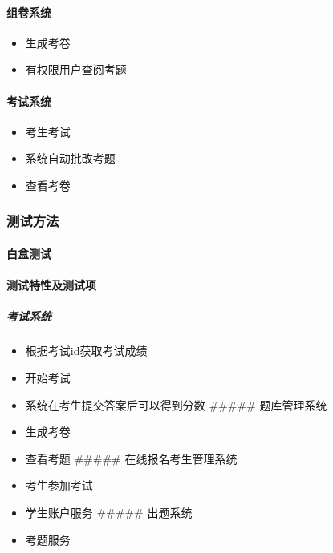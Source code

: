 \documentclass[hyperref, a4paper]{ctexart}
\providecommand{\tightlist}{%
  \setlength{\itemsep}{0pt}\setlength{\parskip}{0pt}}
\let\oldparagraph\paragraph
\renewcommand{\paragraph}[1]{\oldparagraph{#1}\mbox{}}
\let\oldsubparagraph\subparagraph
\renewcommand{\subparagraph}[1]{\oldsubparagraph{#1}\mbox{}}
\begin{document}
\hypertarget{ux7ec4ux5377ux7cfbux7edf-1}{%
\paragraph{组卷系统}\label{ux7ec4ux5377ux7cfbux7edf-1}}

\begin{itemize}
\tightlist
\item
  生成考卷
\item
  有权限用户查阅考题
\end{itemize}

\hypertarget{ux8003ux8bd5ux7cfbux7edf-1}{%
\paragraph{考试系统}\label{ux8003ux8bd5ux7cfbux7edf-1}}

\begin{itemize}
\tightlist
\item
  考生考试
\item
  系统自动批改考题
\item
  查看考卷
\end{itemize}

\hypertarget{ux6d4bux8bd5ux65b9ux6cd5}{%
\subsubsection{测试方法}\label{ux6d4bux8bd5ux65b9ux6cd5}}

\hypertarget{ux767dux76d2ux6d4bux8bd5}{%
\paragraph{白盒测试}\label{ux767dux76d2ux6d4bux8bd5}}

\hypertarget{ux6d4bux8bd5ux7279ux6027ux53caux6d4bux8bd5ux9879}{%
\paragraph{测试特性及测试项}\label{ux6d4bux8bd5ux7279ux6027ux53caux6d4bux8bd5ux9879}}

\hypertarget{ux8003ux8bd5ux7cfbux7edf-2}{%
\subparagraph{考试系统}\label{ux8003ux8bd5ux7cfbux7edf-2}}

\begin{itemize}
\tightlist
\item
  根据考试id获取考试成绩
\item
  开始考试
\item
  系统在考生提交答案后可以得到分数 \#\#\#\#\# 题库管理系统
\item
  生成考卷
\item
  查看考题 \#\#\#\#\# 在线报名考生管理系统
\item
  考生参加考试
\item
  学生账户服务 \#\#\#\#\# 出题系统
\item
  考题服务
\end{itemize}
\end{document}
